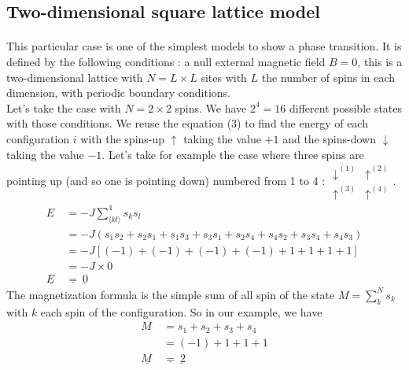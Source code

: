 \documentclass[a4paper, twoside, 11pt]{report}
\theoremstyle{theorem}
\theoremstyle{remark}
\theoremstyle{exemple}
\begin{document}
        \subsection{Two-dimensional square lattice model}
        
            \paragraph{}This particular case is one of the simplest models to show a phase transition. It is defined by the following conditions : a null external magnetic field $B=0$, this is a two-dimensional lattice with $N = L\times L$ sites with $L$ the number of spins in each dimension, with periodic boundary conditions. \\
            Let's take the case with $N=2\times2$ spins. We have $2^4 = 16$ different possible states with those conditions. We reuse the equation (3) to find the energy of each configuration $i$ with the spins-up $\uparrow$ taking the value $+1$ and the spins-down $\downarrow$ taking the value $-1$. Let's take for example the case where three spins are pointing up (and so one is pointing down) numbered from 1 to 4 :
                $\begin{matrix}
                    \downarrow ^{(1)} & \uparrow ^{(2)}\\
                    \uparrow ^{(3)} & \uparrow ^{(4)}
                \end{matrix}$.
                \begin{align*}
                    E &= -J \sum\limits_{\langle kl \rangle}^{4}s_ks_l \\
                      &= -J (s_1s_2 + s_2s_1 + s_1s_3 + s_3s_1 + s_2s_4 + s_4s_2 + s_3s_4 + s_4s_3) \\
                      &= -J \left[(-1) + (-1) + (-1) + (-1) + 1 + 1 + 1 + 1\right] \\
                      &= -J \times 0 \\
                    \underline{E\ }&\underline{=}\underline{\ 0} 
                \end{align*}
            The magnetization formula is the simple sum of all spin of the state $\displaystyle M = \sum\limits_{k}^{N} s_k$ with $k$ each spin of the configuration. So in our example, we have 
                \begin{align*}
                    M &= s_1 + s_2 + s_3 + s_4 \\
                      &= (-1) + 1 + 1 + 1 \\
                    \underline{M\ }&\underline{=}\underline{\ 2}
                \end{align*}
\end{document}
